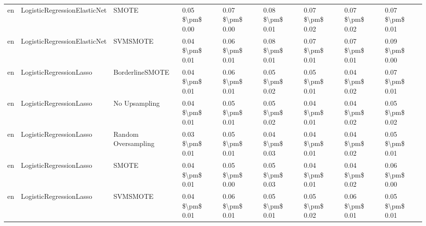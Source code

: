 \begin{tabular}{lllllllll}
      en &    LogisticRegressionElasticNet &                         SMOTE & 0.05 \$\textbackslash pm\$ 0.00 &           0.07 \$\textbackslash pm\$ 0.00 &       0.08 \$\textbackslash pm\$ 0.01 &        0.07 \$\textbackslash pm\$ 0.02 &                         0.07 \$\textbackslash pm\$ 0.02 &     0.07 \$\textbackslash pm\$ 0.01 \\
      en &    LogisticRegressionElasticNet &                      SVMSMOTE & 0.04 \$\textbackslash pm\$ 0.01 &           0.06 \$\textbackslash pm\$ 0.01 &       0.08 \$\textbackslash pm\$ 0.01 &        0.07 \$\textbackslash pm\$ 0.01 &                         0.07 \$\textbackslash pm\$ 0.01 &     0.09 \$\textbackslash pm\$ 0.00 \\
      en &         LogisticRegressionLasso &               BorderlineSMOTE & 0.04 \$\textbackslash pm\$ 0.01 &           0.06 \$\textbackslash pm\$ 0.01 &       0.05 \$\textbackslash pm\$ 0.02 &        0.05 \$\textbackslash pm\$ 0.01 &                         0.04 \$\textbackslash pm\$ 0.02 &     0.07 \$\textbackslash pm\$ 0.01 \\
      en &         LogisticRegressionLasso &                 No Upsampling & 0.04 \$\textbackslash pm\$ 0.01 &           0.05 \$\textbackslash pm\$ 0.01 &       0.05 \$\textbackslash pm\$ 0.02 &        0.04 \$\textbackslash pm\$ 0.01 &                         0.04 \$\textbackslash pm\$ 0.02 &     0.05 \$\textbackslash pm\$ 0.02 \\
      en &         LogisticRegressionLasso &           Random Oversampling & 0.03 \$\textbackslash pm\$ 0.01 &           0.05 \$\textbackslash pm\$ 0.01 &       0.04 \$\textbackslash pm\$ 0.03 &        0.04 \$\textbackslash pm\$ 0.01 &                         0.04 \$\textbackslash pm\$ 0.02 &     0.05 \$\textbackslash pm\$ 0.01 \\
      en &         LogisticRegressionLasso &                         SMOTE & 0.04 \$\textbackslash pm\$ 0.01 &           0.05 \$\textbackslash pm\$ 0.00 &       0.05 \$\textbackslash pm\$ 0.03 &        0.04 \$\textbackslash pm\$ 0.01 &                         0.04 \$\textbackslash pm\$ 0.02 &     0.06 \$\textbackslash pm\$ 0.00 \\
      en &         LogisticRegressionLasso &                      SVMSMOTE & 0.04 \$\textbackslash pm\$ 0.01 &           0.06 \$\textbackslash pm\$ 0.01 &       0.05 \$\textbackslash pm\$ 0.01 &        0.05 \$\textbackslash pm\$ 0.02 &                         0.06 \$\textbackslash pm\$ 0.01 &     0.05 \$\textbackslash pm\$ 0.01 \\

\end{tabular}
